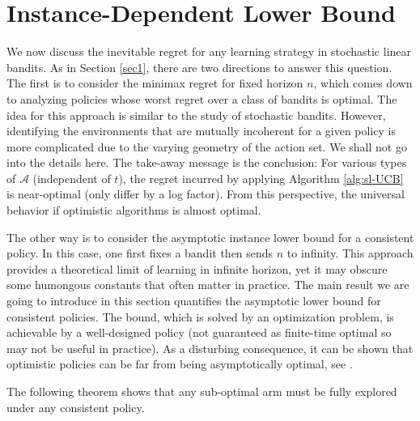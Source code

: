 \documentclass[letterpaper,11pt,openright,openany]{book}
\numberwithin{equation}{section}
\theoremstyle{plain}
\theoremstyle{definition}
\begin{document}
\section{Instance-Dependent Lower Bound}
We now discuss the inevitable regret for any learning strategy in stochastic linear bandits. As in Section \ref{sec1}, there are two directions to answer this question.  The first is to consider the minimax regret for fixed horizon $n$, which comes down to analyzing policies whose worst regret over a class of bandits is optimal. The idea for this approach is similar to the study of stochastic bandits. However, identifying the environments that are mutually incoherent for a given policy is more complicated due to the varying geometry of the action set. We shall not go into the details here. The take-away message is the conclusion: For various types of $\mathcal A$ (independent of $t$), the regret incurred by applying Algorithm \ref{alg:sl-UCB} is near-optimal (only differ by a log factor). From this perspective, the universal behavior if optimistic algorithms is almost optimal. 

The other way is to consider the asymptotic instance lower bound for a consistent policy.  In this case, one first fixes a bandit then sends $n$ to infinity. This approach provides a theoretical limit of learning in infinite horizon, yet it may obscure some humongous constants that often matter in practice. The main result we are going to introduce in this section quantifies the asymptotic lower bound for consistent policies. The bound, which is solved by an optimization problem, is achievable by a well-designed policy (not guaranteed as finite-time optimal so may not be useful in practice).  As a disturbing consequence, it can be shown that optimistic policies can be far from being asymptotically optimal, see \cite{lattimore2016end}. 

The following theorem shows that any sub-optimal arm must be fully explored under any consistent policy. 
\end{document}
